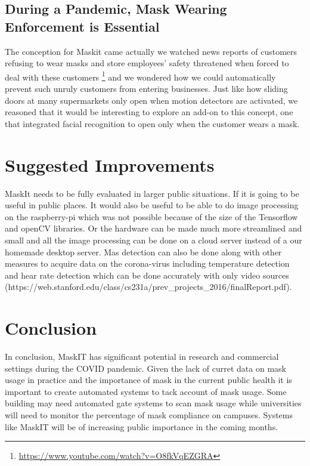 \documentclass[conference, 12pt, onecolumn]{IEEEtran}
\begin{document}
\subsection{During a Pandemic, Mask Wearing Enforcement is Essential}
The conception for Maskit came actually we watched news reports of customers refusing to wear masks and store employees' safety threatened when forced to deal with these customers \footnote{\url{https://www.youtube.com/watch?v=O8fkVqEZGRA}} and we wondered how we could automatically prevent such unruly customers from entering businesses. Just like how sliding doors at many supermarkets only open when motion detectors are activated, we reasoned that it would be interesting to explore an add-on to this concept, one that integrated facial recognition to open only when the customer wears a mask. 
\section{Suggested Improvements}
MaskIt needs to be fully evaluated in larger public situations. If it is going to be useful in public places. It would also be useful to be able to do image processing on the raspberry-pi which was not possible because of the size of the Tensorflow and openCV libraries.
Or the hardware can be made much more streamlined and small and all the image processing can be done on a cloud server instead of a our homemade desktop server. Mas detection can also be done along with other measures to acquire data on the corona-virus including temperature detection and hear rate detection which can be done accurately with only video sources (https://web.stanford.edu/class/cs231a/prev_projects_2016/finalReport.pdf).


\section{Conclusion}
In conclusion, MaskIT has significant potential in research and commercial settings during the COVID pandemic. Given the lack of curret data on mask usage in practice and the importance of mask in the current public health it is important to create automated systems to tack account of mask usage. Some building may need automated gate systems to scan mask usage while universities will need to monitor the percentage of mask compliance on campuses. Systems like MaskIT will be of increasing public importance in the coming months. 



\end{document}

